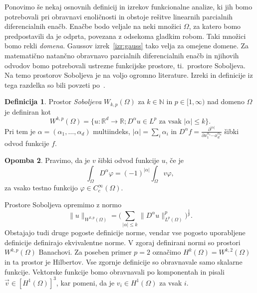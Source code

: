 \documentclass[12pt,a4paper,twoside]{article}
\theoremstyle{definition} %
\newtheorem{definicija}{Definicija}[section]
\newtheorem{opomba}[definicija]{Opomba}
\theoremstyle{plain} %
\newtheorem{trditev}[definicija]{Trditev}
\numberwithin{equation}{section}
\newcommand{\R}{\mathbb R}
\newcommand{\N}{\mathbb N}
\renewcommand{\phi}{\varphi}
\newcommand{\dpar}[2]{\ensuremath{\frac{\partial #1}{\partial #2}}}
\newcommand{\vv}{\vec{v}}
\begin{document}
Ponovimo še nekaj osnovnih definicij in izrekov funkcionalne analize, ki jih bomo potrebovali pri
obravnavi enoličnosti in obstoje rešitve linearnih parcialnih diferencialnih enačb. Enačbe bodo
veljale na neki množici $\Omega$, za katero bomo predpostavili da je odprta, povezana z odsekoma
gladkim robom.  Taki množici bomo rekli \emph{domena}. Gaussov izrek~\ref{izr:gauss} tako velja za
omejene domene. Za matematično natančno obravnavo parcialnih diferencialnih enačb in njihovih
odvodov bomo potrebovali ustrezne funkcijske prostore, ti.\ prostore Soboljeva.  Na temo prostorov
Soboljeva je na voljo ogromno literature. Izreki in definicije iz tega razdelka so bili povzeti
po~\cite{adams2003sobolev}.

\begin{definicija}
  Prostor \emph{Soboljeva} $W_{k,p}(\Omega)$ za $k \in \N$ in $p \in [1,
  \infty)$ nad domeno $\Omega$ je definiran kot
  \[
    W^{k,p}(\Omega) = \{u\colon\R^d\to\R; D^\alpha u \in L^p \text{ za vsak }
    |\alpha| \leq k \}.
  \]
  Pri tem je $\alpha = (\alpha_1, \dots, \alpha_d)$ multiindeks, $|\alpha| =
  \sum_i\alpha_i$ in $D^\alpha f = \dpar{^{|\alpha|}}{x_1^{\alpha_1}\cdots
  x_d^{\alpha_d}}$ šibki odvod funkcije $f$.
\end{definicija}
\begin{opomba}
  Pravimo, da je $v$ šibki odvod funkcije $u$, če je
  \[
    \int_\Omega D^\alpha\phi = (-1)^{|\alpha|}\int_\Omega v \phi,
  \]
  za vsako testno funkcijo $\phi \in C^\infty_c(\Omega)$.
\end{opomba}

Prostore Soboljeva opremimo z normo
\[
\|u\|_{W^{k,p}(\Omega)} = \Big(\sum_{|\alpha| \leq k} \|D^\alpha
u\|_{L^p(\Omega)}^p\Big)^\frac1p.
\]
Obstajajo tudi druge pogoste definicije norme, vendar vse pogosto uporabljene
definicije definirajo ekvivalentne norme. V zgoraj definirani normi so prostori
$W^{k,p}(\Omega)$ Banachovi. Za poseben primer $p = 2$ označimo $H^k(\Omega) =
W^{k,2}(\Omega)$ in ta prostor je Hilbertov.
Vse zgornje definicije so obravnavale samo skalarne funkcije.
Vektorske funkcije bomo obravnavali po komponentah in pisali
$\vv \in [H^1(\Omega)]^3$, kar pomeni, da je $v_i \in H^1(\Omega)$ za vsak $i$.


\end{document}
